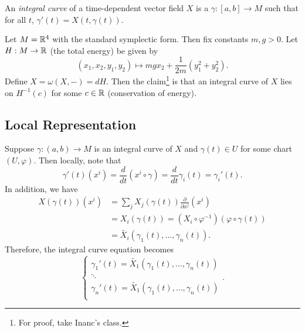 \documentclass[twoside, 10pt]{article}
\begin{document}
    \begin{defn}
        An \textit{integral curve} of a time-dependent vector field $X$ is a $\gamma:[a,b] \to M$ such that for all $t$, $\gamma'(t) = X(t,\gamma(t))$.
    \end{defn}

    \begin{exm}
        Let $M = \mathbb{R}^4$ with the standard symplectic form. Then fix constants $m,g > 0$. Let $H: M \to \mathbb{R}$ (the total energy) be given by 
        \[(x_1, x_2, y_1,y_2) \mapsto mgx_2 + \frac{1}{2m} (y_1^2 + y_2^2).\]
        Define $X = \omega(X,-) = dH$. Then the claim\footnote{For proof, take Inanc's class.} is that an integral curve of $X$ lies on $H^{-1}(c)$ for some $c \in \mathbb{R}$ (conservation of energy).
    \end{exm}

    \subsection{Local Representation}%
    \label{sub:local_representation}

    Suppose $\gamma: (a,b) \to M$ is an integral curve of $X$ and $\gamma(t) \in U$ for some chart $(U, \varphi)$. Then locally, note that 
    \[ \gamma'(t)(x^i) = \frac{d}{dt} (x^i \circ \gamma) = \frac{d}{dt} \gamma_i(t) = \gamma_i'(t). \]
    In addition, we have
    \begin{align*}
        X(\gamma(t))(x^i) &= \sum_j X_j(\gamma(t)) \frac{\partial}{\partial x^j} (x^i) \\
                          &= X_i(\gamma(t)) = (X_i \circ \varphi^{-1})(\varphi \circ \gamma(t)) \\
                          &= \widetilde{X_i}(\gamma_1(t), \ldots, \gamma_n(t)).
    \end{align*}
    Therefore, the integral curve equation becomes
    \begin{equation} 
        \begin{cases}
        \gamma_1'(t) = \widetilde{X_1}(\gamma_1(t), \ldots, \gamma_n(t)) \\
        \ddots \\
        \gamma_n'(t) = \widetilde{X_1}(\gamma_1(t), \ldots, \gamma_n(t)) \\
    \end{cases}.
    \end{equation}
\end{document}
